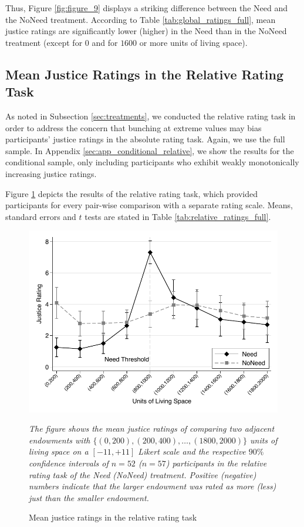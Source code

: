 \documentclass[12pt]{scrartcl}
\begin{document}
Thus, Figure \ref{fig:figure_9} displays a striking difference between the Need and the NoNeed treatment.
According to Table \ref{tab:global_ratings_full}, mean justice ratings are significantly lower (higher) in the Need than in the NoNeed treatment (except for $0$ and for $1600$ or more units of living space).


\subsection{Mean Justice Ratings in the Relative Rating Task}\label{sec:relative}
As noted in Subsection \ref{sec:treatments}, we conducted the relative rating task in order to address the concern that bunching at extreme values may bias participants' justice ratings in the absolute rating task.
Again, we use the full sample.
In Appendix \ref{sec:app_conditional_relative}, we show the results for the conditional sample, only including participants who exhibit weakly monotonically increasing justice ratings.

Figure \ref{fig:figure_10} depicts the results of the relative rating task, which provided participants for every pair-wise comparison with a separate rating scale.
Means, standard errors and $t$ tests are stated in Table \ref{tab:relative_ratings_full}.

\begin{figure}[h]
   \centering
   \includegraphics{figures/figure_10.pdf}
   \begin{minipage}{\linewidth}
      \footnotesize
      \textit{The figure shows the mean justice ratings of comparing two adjacent endowments with $\{(0,200),(200,400),\ldots,(1800,2000)\}$ units of living space on a $[-11,+11]$ Likert scale and the respective $90\%$ confidence intervals of $n=52$ ($n=57$) participants in the relative rating task of the Need (NoNeed) treatment. Positive (negative) numbers indicate that the larger endowment was rated as more (less) just than the smaller endowment.}
   \end{minipage}
   \caption{Mean justice ratings in the relative rating task}
   \label{fig:figure_10}
\end{figure}
\end{document}
